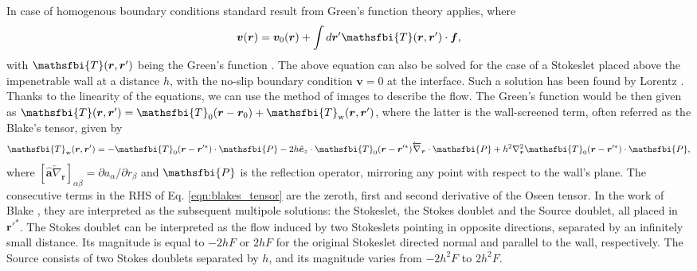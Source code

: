 \documentclass{master_thesis}
\begin{document}
In case of homogenous boundary conditions standard result from Green's function theory applies, where
\begin{equation}
    \boldsymbol{v}(\boldsymbol{r}) = \boldsymbol{v}_0(\boldsymbol{r}) + \int d\boldsymbol{r}' \mathsfbi{T}(\boldsymbol{r}, \boldsymbol{r}') \cdot \boldsymbol{f},
\end{equation}
with $\mathsfbi{T}(\boldsymbol{r}, \boldsymbol{r}')$ being the Green's function \cite{lisicki_2013}. The above equation can also be solved for the case of a Stokeslet placed above the impenetrable wall at a distance $h$, with the no-slip boundary condition $\boldsymbol{v}=0$ at the interface. Such a solution has been found by Lorentz \cite{lorentz_1907}. Thanks to the linearity of the equations, we can use the method of images to describe the flow. The Green's function would be then given as $\mathsfbi{T}(\boldsymbol{r}, \boldsymbol{r}') = \mathsfbi{T}_0(\boldsymbol{r} - \boldsymbol{r}_0) + \mathsfbi{T}_\textrm{w}(\boldsymbol{r}, \boldsymbol{r}')$, where the latter is the wall-screened term, often referred as the Blake's tensor, given by
\begin{equation}
    \mathsfbi{T}_\textrm{w}(\boldsymbol{r}, \boldsymbol{r}') = -\mathsfbi{T}_0(\boldsymbol{r} - \boldsymbol{r}'^*) \cdot \mathsfbi{P} - 2h\hat{\bm{e}}_z \cdot \mathsfbi{T}_0(\boldsymbol{r} - \boldsymbol{r}'^*) \overleftarrow{\nabla}_{\boldsymbol{r}} \cdot \mathsfbi{P} + h^2 \nabla_{\boldsymbol{r}}^2 \mathsfbi{T}_0(\boldsymbol{r} - \boldsymbol{r}'^*) \cdot \mathsfbi{P},
\label{eqn:blakes_tensor}
\end{equation}
where $[\hat{\bm{a}}\overleftarrow{\nabla}_{\boldsymbol{r}}]_{\alpha\beta}=\partial a_\alpha / \partial r_\beta$ and $\mathsfbi{P}$ is the reflection operator, mirroring any point with respect to the wall's plane. The consecutive terms in the RHS of Eq. \eqref{eqn:blakes_tensor} are the zeroth, first and second derivative of the Oseen tensor. In the work of Blake \cite{blake1971}, they are interpreted as the subsequent multipole solutions: the Stokeslet, the Stokes doublet and the Source doublet, all placed in $\boldsymbol{r}'^*$. The Stokes doublet can be interpreted as the flow induced by two Stokeslets pointing in opposite directions, separated by an infinitely small distance. Its magnitude is equal to $-2hF$ or $2hF$ for the original Stokeslet directed normal and parallel to the wall, respectively. The Source consists of two Stokes doublets separated by $h$, and its magnitude varies from $-2h^2F$ to $2h^2F$.
\end{document}
